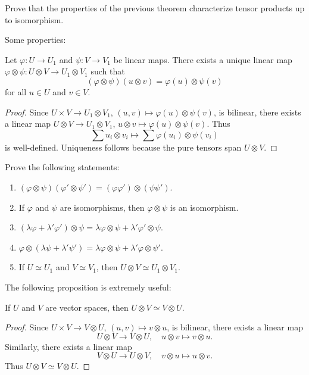 \begin{exercise}
	\label{xca:tensorial_unicidad}
	Prove that the properties of the previous theorem characterize tensor products up to isomorphism. 
\end{exercise}

Some properties:

\begin{proposition}
	Let $\varphi\colon U\to U_1$ and $\psi\colon V\to V_1$ be linear maps. There
	exists a unique linear map 
	$\varphi\otimes\psi\colon U\otimes V\to U_1\otimes V_1$ such that
	\[
		(\varphi\otimes\psi)(u\otimes v)=\varphi(u)\otimes\psi(v)
	\]
	for all $u\in U$ and $v\in V$.
\end{proposition}

\begin{proof}
	Since $U\times V\to U_1\otimes V_1$,
	$(u,v)\mapsto\varphi(u)\otimes\psi(v)$, is bilinear, there exists a linear map
	$U\otimes V\to U_1\otimes V_1$, $u\otimes
	v\mapsto\varphi(u)\otimes\psi(v)$. Thus 
	\[
		\sum u_i\otimes v_i\mapsto\sum\varphi(u_i)\otimes\psi(v_i)
	\]
	is well-defined. Uniqueness follows because the pure tensors span $U\otimes V$.
\end{proof}

\begin{exercise}
    Prove the following statements:
	\begin{enumerate}
		\item $(\varphi\otimes\psi)(\varphi'\otimes\psi')=(\varphi\varphi')\otimes(\psi\psi')$.
		\item If $\varphi$ and $\psi$ are isomorphisms, then 
			$\varphi\otimes\psi$ is an isomorphism. 
		\item $(\lambda\varphi+\lambda'\varphi')\otimes\psi=\lambda\varphi\otimes\psi+\lambda'\varphi'\otimes\psi$.
		\item $\varphi\otimes(\lambda\psi+\lambda'\psi')=\lambda\varphi\otimes\psi+\lambda'\varphi\otimes\psi'$.
		\item If $U\simeq U_1$ and $V\simeq V_1$, then $U\otimes V\simeq U_1\otimes V_1$.
	\end{enumerate}
\end{exercise}

The following proposition is extremely useful:

\begin{proposition}
	If $U$ and $V$ are vector spaces, then  
	$U\otimes V\simeq V\otimes U$.
\end{proposition}

\begin{proof}
	Since $U\times V\to V\otimes U$, $(u,v)\mapsto v\otimes u$, is bilinear, there exists 
	a linear map 
    \[
    U\otimes V\to V\otimes U,\quad u\otimes
	v\mapsto v\otimes u.
    \]
    Similarly, there exists a linear map 
	\[
    V\otimes U\to U\otimes V,\quad  v\otimes u\mapsto
	u\otimes v.
    \]
    Thus $U\otimes V\simeq V\otimes U$.
\end{proof}

